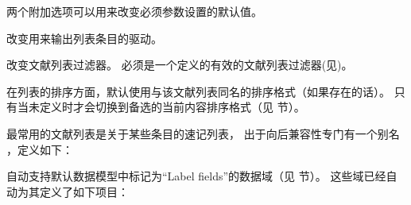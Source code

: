 \begin{ltxsyntax}
两个附加选项可以用来改变必须参数设置的默认值。

\begin{optionlist*}

改变用来输出列表条目的驱动。



改变文献列表过滤器。 必须是一个定义的有效的文献列表过滤器(见)。 
\end{optionlist*}


在列表的排序方面，默认使用与该文献列表同名的排序格式（如果存在的话）。
只有当未定义时才会切换到备选的当前内容排序格式（见  节）。


最常用的文献列表是关于某些条目的速记列表，
出于向后兼容性专门有一个别名 ，定义如下：

\begin{ltxexample}
\end{ltxexample}



\biblatex 自动支持默认数据模型中标记为“Label fields”的数据域（见  节）。
这些域已经自动为其定义了如下项目：


\end{ltxsyntax}
